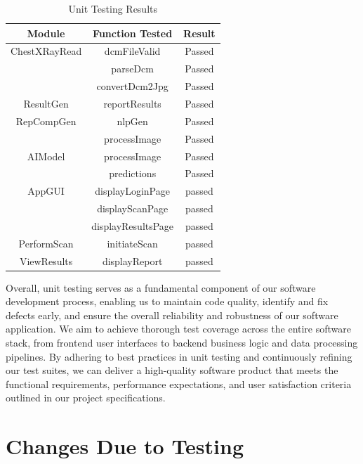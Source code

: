 \documentclass[12pt, titlepage]{article}
\begin{document}
\begin{table}[H]
  \centering
  \label{tab:unitTestingResults}
  \begin{tabular}{|c|c|c|}
    \hline
    \textbf{Module} & \textbf{Function Tested} & \textbf{Result} \\
    \hline
    ChestXRayRead & dcmFileValid & Passed \\
             & parseDcm & Passed \\
             & convertDcm2Jpg & Passed \\
    \hline
    ResultGen & reportResults & Passed \\      
    \hline
    RepCompGen & nlpGen & Passed \\
                & processImage & Passed \\
    \hline
    AIModel & processImage & Passed \\
            & predictions & Passed \\ 
    \hline
    AppGUI & displayLoginPage & passed \\
            & displayScanPage & passed \\
            & displayResultsPage & passed \\
    \hline
    PerformScan & initiateScan & passed\\
    \hline
    ViewResults & displayReport & passed \\
    \hline
    
  \end{tabular}
  \caption{Unit Testing Results}
\end{table}

Overall, unit testing serves as a fundamental component of our software development process, enabling us to maintain code quality, identify and fix defects early, and ensure the overall reliability and robustness of our software application. We aim to achieve thorough test coverage across the entire software stack, from frontend user interfaces to backend business logic and data processing pipelines. By adhering to best practices in unit testing and continuously refining our test suites, we can deliver a high-quality software product that meets the functional requirements, performance expectations, and user satisfaction criteria outlined in our project specifications.

\section{Changes Due to Testing}
\end{document}
